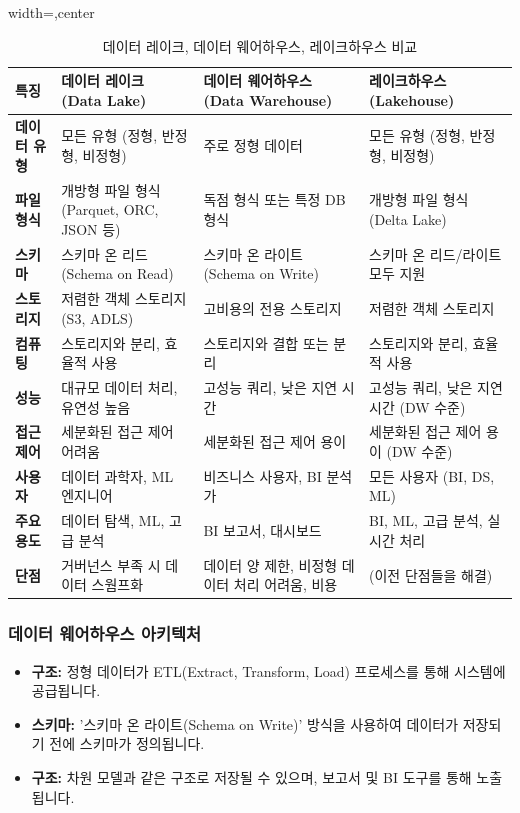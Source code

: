 \documentclass[11pt,a4paper]{article}
\begin{document}
\begin{table}[h!]
\centering
\caption{데이터 레이크, 데이터 웨어하우스, 레이크하우스 비교}
\label{tab:data_storage_comparison}
\begin{adjustbox}{width=\textwidth,center}
\begin{tabular}{p{}p{}p{}p{}}
\toprule
\textbf{특징} & \textbf{데이터 레이크 (Data Lake)} & \textbf{데이터 웨어하우스 (Data Warehouse)} & \textbf{레이크하우스 (Lakehouse)} \\
\midrule
\textbf{데이터 유형} & 모든 유형 (정형, 반정형, 비정형) & 주로 정형 데이터 & 모든 유형 (정형, 반정형, 비정형) \\
\textbf{파일 형식} & 개방형 파일 형식 (Parquet, ORC, JSON 등) & 독점 형식 또는 특정 DB 형식 & 개방형 파일 형식 (Delta Lake) \\
\textbf{스키마} & 스키마 온 리드 (Schema on Read) & 스키마 온 라이트 (Schema on Write) & 스키마 온 리드/라이트 모두 지원 \\
\textbf{스토리지} & 저렴한 객체 스토리지 (S3, ADLS) & 고비용의 전용 스토리지 & 저렴한 객체 스토리지 \\
\textbf{컴퓨팅} & 스토리지와 분리, 효율적 사용 & 스토리지와 결합 또는 분리 & 스토리지와 분리, 효율적 사용 \\
\textbf{성능} & 대규모 데이터 처리, 유연성 높음 & 고성능 쿼리, 낮은 지연 시간 & 고성능 쿼리, 낮은 지연 시간 (DW 수준) \\
\textbf{접근 제어} & 세분화된 접근 제어 어려움 & 세분화된 접근 제어 용이 & 세분화된 접근 제어 용이 (DW 수준) \\
\textbf{사용자} & 데이터 과학자, ML 엔지니어 & 비즈니스 사용자, BI 분석가 & 모든 사용자 (BI, DS, ML) \\
\textbf{주요 용도} & 데이터 탐색, ML, 고급 분석 & BI 보고서, 대시보드 & BI, ML, 고급 분석, 실시간 처리 \\
\textbf{단점} & 거버넌스 부족 시 데이터 스웜프화 & 데이터 양 제한, 비정형 데이터 처리 어려움, 비용 & (이전 단점들을 해결) \\
\bottomrule
\end{tabular}
\end{adjustbox}
\end{table}

\subsubsection{데이터 웨어하우스 아키텍처}
\begin{itemize}
    \item \textbf{구조:} 정형 데이터가 ETL(Extract, Transform, Load) 프로세스를 통해 시스템에 공급됩니다.
    \item \textbf{스키마:} '스키마 온 라이트(Schema on Write)' 방식을 사용하여 데이터가 저장되기 전에 스키마가 정의됩니다.
    \item \textbf{구조:} 차원 모델과 같은 구조로 저장될 수 있으며, 보고서 및 BI 도구를 통해 노출됩니다.
\end{itemize}
\end{document}
